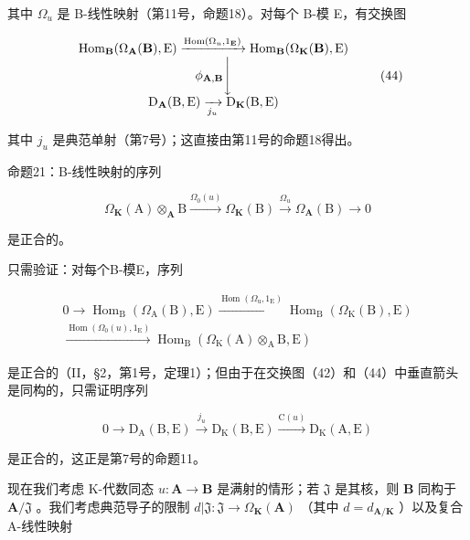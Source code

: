 其中 \(\Omega_{u}\) 是 B-线性映射（第11号，命题18）。对每个 B-模 E，有交换图

\[
\begin{array}{c} \operatorname{Hom} _ {\mathbf {B}} (\Omega_ {\mathbf {A}} (\mathbf {B}), \mathrm{E}) \xrightarrow {\operatorname{Hom} (\Omega_ {u} , 1 _ {\mathbf {E}})} \operatorname{Hom} _ {\mathbf {B}} (\Omega_ {\mathbf {K}} (\mathbf {B}), \mathrm{E}) \\ \phi_ {\mathbf {A}, \mathbf {B}} \Biggl \downarrow \\ \mathrm{D} _ {\mathbf {A}} (\mathrm{B}, \mathrm{E}) \xrightarrow [ j _ {u} ]{} \mathrm{D} _ {\mathbf {K}} (\mathrm{B}, \mathrm{E}) \end{array}\tag{44}
\]

其中 \(j_{u}\) 是典范单射（第7号）；这直接由第11号的命题18得出。

命题21：B-线性映射的序列

\[
\Omega_ {\mathbf {K}} (\mathrm{A}) \otimes_ {\mathbf {A}} \mathrm{B} \xrightarrow {\Omega_ {0} (u)} \Omega_ {\mathbf {K}} (\mathrm{B}) \xrightarrow {\Omega_ {u}} \Omega_ {\mathbf {A}} (\mathrm{B}) \to 0\tag{45}
\]

是正合的。

只需验证：对每个B-模E，序列

\[
\begin{array}{c} 0 \to \operatorname{Hom} _ {\mathrm{B}} (\Omega_ {\mathrm{A}} (\mathrm{B}), \mathrm{E}) \xrightarrow {\operatorname{Hom} (\Omega_ {\mathrm{u}} , 1 _ {\mathrm{E}})} \operatorname{Hom} _ {\mathrm{B}} (\Omega_ {\mathrm{K}} (\mathrm{B}), \mathrm{E}) \\ \xrightarrow {\operatorname{Hom} (\Omega_ {0} (u) , 1 _ {\mathrm{E}})} \operatorname{Hom} _ {\mathrm{B}} (\Omega_ {\mathrm{K}} (\mathrm{A}) \otimes_ {\mathrm{A}} \mathrm{B}, \mathrm{E}) \end{array}
\]

是正合的（II，§2，第1号，定理1）；但由于在交换图（42）和（44）中垂直箭头是同构的，只需证明序列

\[
0 \longrightarrow \mathrm{D} _ {\mathrm{A}} (\mathrm{B}, \mathrm{E}) \xrightarrow {j _ {u}} \mathrm{D} _ {\mathrm{K}} (\mathrm{B}, \mathrm{E}) \xrightarrow {\mathrm{C} (u)} \mathrm{D} _ {\mathrm{K}} (\mathrm{A}, \mathrm{E})
\]

是正合的，这正是第7号的命题11。

现在我们考虑 K-代数同态 \(u: \mathbf{A} \to \mathbf{B}\) 是满射的情形；若 \(\mathfrak{J}\) 是其核，则 \(\mathbf{B}\) 同构于 \(\mathbf{A} / \mathfrak{J}\) 。我们考虑典范导子的限制 \(d| \mathfrak{J}: \mathfrak{J} \to \Omega_{\mathbf{K}}(\mathbf{A})\) （其中 \(d = d_{\mathbf{A} / \mathbf{K}}\) ）以及复合 A-线性映射

